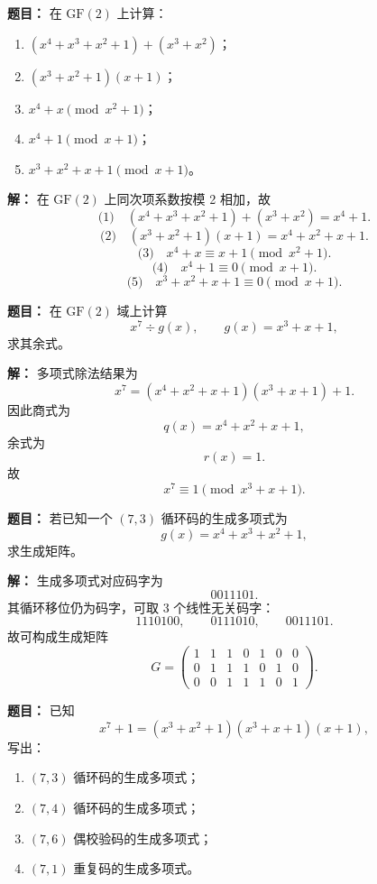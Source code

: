 \medskip
{}
\textbf{题目：}
在 $\mathrm{GF}(2)$ 上计算：
\begin{enumerate}
\item $(x^4+x^3+x^2+1)+(x^3+x^2)$；
\item $(x^3+x^2+1)(x+1)$；
\item $x^4+x \pmod{x^2+1}$；
\item $x^4+1 \pmod{x+1}$；
\item $x^3+x^2+x+1 \pmod{x+1}$。
\end{enumerate}

\par\textbf{解：}
在 $\mathrm{GF}(2)$ 上同次项系数按模 2 相加，故
\[
\text{(1)}\quad (x^4+x^3+x^2+1)+(x^3+x^2)=x^4+1.
\]
\[
\text{(2)}\quad (x^3+x^2+1)(x+1)=x^4+x^2+x+1.
\]
\[
\text{(3)}\quad x^4+x \equiv x+1 \pmod{x^2+1}.
\]
\[
\text{(4)}\quad x^4+1 \equiv 0 \pmod{x+1}.
\]
\[
\text{(5)}\quad x^3+x^2+x+1 \equiv 0 \pmod{x+1}.
\]

\medskip
{}
\textbf{题目：}
在 $\mathrm{GF}(2)$ 域上计算
\[
x^7 \div g(x),\qquad g(x)=x^3+x+1,
\]
求其余式。

\par\textbf{解：}
多项式除法结果为
\[
x^7=(x^4+x^2+x+1)(x^3+x+1)+1.
\]
因此商式为
\[
q(x)=x^4+x^2+x+1,
\]
余式为
\[
r(x)=1.
\]
故
\[
x^7 \equiv 1 \pmod{x^3+x+1}.
\]

\medskip
{}
\textbf{题目：}
若已知一个 $(7,3)$ 循环码的生成多项式为
\[
g(x)=x^4+x^3+x^2+1,
\]
求生成矩阵。

\par\textbf{解：}
生成多项式对应码字为
\[
0011101.
\]
其循环移位仍为码字，可取 3 个线性无关码字：
\[
1110100,\qquad 0111010,\qquad 0011101.
\]
故可构成生成矩阵
\[
G=
\begin{pmatrix}
1&1&1&0&1&0&0\\
0&1&1&1&0&1&0\\
0&0&1&1&1&0&1
\end{pmatrix}.
\]

\medskip
{}
\textbf{题目：}
已知
\[
x^7+1=(x^3+x^2+1)(x^3+x+1)(x+1),
\]
写出：
\begin{enumerate}
\item $(7,3)$ 循环码的生成多项式；
\item $(7,4)$ 循环码的生成多项式；
\item $(7,6)$ 偶校验码的生成多项式；
\item $(7,1)$ 重复码的生成多项式。
\end{enumerate}

